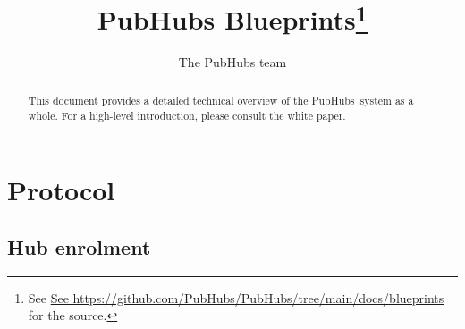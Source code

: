 \documentclass[a4paper]{amsbook}
\begin{document}
\frontmatter

\title{PubHubs Blueprints\footnote{See
	\url{See https://github.com/PubHubs/PubHubs/tree/main/docs/blueprints} for the source.}}

\author{The PubHubs team}


\begin{abstract}
	This document provides a detailed technical overview of the PubHubs\ system as a whole.
For a high-level introduction,
	please consult the white paper\cite{whitepaper}.

\end{abstract}

\maketitle

\setcounter{page}{4}

\tableofcontents

\mainmatter


\chapter{Protocol}
\section{Hub enrolment}

\appendix

\backmatter




\printindex
\end{document}
